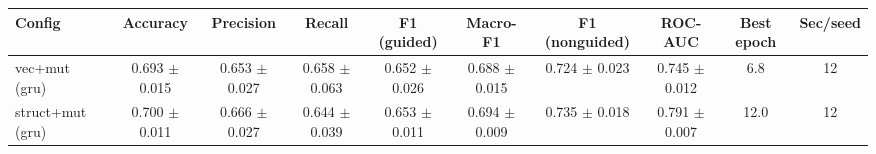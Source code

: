 \begin{tabular}{lccccccccc}
\hline
Config & Accuracy & Precision & Recall & F1 (guided) & Macro-F1 & F1 (nonguided) & ROC-AUC & Best epoch & Sec/seed \\
\hline
vec+mut (gru) & 0.693 $\pm$ 0.015 & 0.653 $\pm$ 0.027 & 0.658 $\pm$ 0.063 & 0.652 $\pm$ 0.026 & 0.688 $\pm$ 0.015 & 0.724 $\pm$ 0.023 & 0.745 $\pm$ 0.012 & 6.8 & 12 \\
struct+mut (gru) & 0.700 $\pm$ 0.011 & 0.666 $\pm$ 0.027 & 0.644 $\pm$ 0.039 & 0.653 $\pm$ 0.011 & 0.694 $\pm$ 0.009 & 0.735 $\pm$ 0.018 & 0.791 $\pm$ 0.007 & 12.0 & 12 \\
\hline
\end{tabular}
